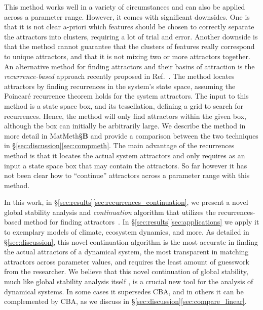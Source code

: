 \documentclass[9pt,twocolumn,twoside,lineno]{pnas-new}
\begin{document}
This method works well in a variety of circumstances and can also be applied across a parameter range. However, it comes with significant downsides. One is that it is not clear a-priori which features should be chosen to correctly separate the attractors into clusters, requiring a lot of trial and error. Another downside is that the method cannot guarantee that the clusters of features really correspond to unique attractors, and that it is not mixing two or more attractors together.
An alternative method for finding attractors and their basins of attraction is the \emph{recurrence-based} approach recently proposed in Ref.~\cite{DatserisWagemakers2022}. The method locates attractors by finding recurrences in the system's state space, assuming the Poincar\'e recurrence theorem holds for the system attractors. The input to this method is a state space box, and its tessellation, defining a grid to search for recurrences. Hence, the method will only find attractors within the given box, although the box can initially be arbitrarily large.
We describe the method in more detail in MatMeth\S\textbf{B} and provide a comparison between the two techniques in \S\ref{sec:discussion}\ref{sec:compmeth}. The main advantage of the recurrences method is that it locates the actual system attractors and only requires as an input a state space box that may contain the attractors. So far however it has not been clear how to ``continue'' attractors across a parameter range with this method.

In this work, in \S\ref{sec:results}\ref{sec:recurrences_continuation}, we present a novel global stability analysis and \emph{continuation} algorithm that utilizes the recurrences-based method for finding attractors~\cite{DatserisWagemakers2022}. In \S\ref{sec:results}\ref{sec:applications} we apply it to exemplary models of climate, ecosystem dynamics, and more. As detailed in \S\ref{sec:discussion}, this novel continuation algorithm is the most accurate in finding the actual attractors of a dynamical system, the most transparent in matching attractors across parameter values, and requires the least amount of guesswork from the researcher. 
We believe that this novel continuation of global stability, much like global stability analysis itself \cite{Menck2013}, is a crucial new tool for the analysis of dynamical systems. In some cases it supersedes CBA, and in others it can be complemented by CBA, as we discuss in \S\ref{sec:discussion}\ref{sec:compare_linear}.
\end{document}
